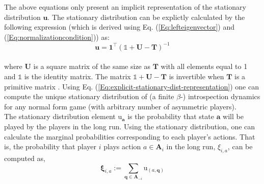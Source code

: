 \documentclass[11pt]{article}
\theoremstyle{plainCl1}
\theoremstyle{plainCl2}
\newcommand{\A}{\mathbf{A}}
\newcommand{\abf}{\mathbf{a}}
\newcommand{\qbf}{\mathbf{q}}
\newcommand{\T}{\mathbf{T}}
\newcommand{\ubf}{\mathbf{u}}
\begin{document}
\noindent The above equations only present an implicit representation of the stationary distribution $\ubf$. The stationary distribution can be explictly calculated by the following expression (which is derived using Eq. (\ref{Eq:lefteigenvector}) and (\ref{Eq:normalizationcondition})) as:
\begin{equation}
\ubf = \mathbf{1}^\intercal (\mathbb{1} + \mathbf{U} - \T)^{-1}
\label{Eq:explicit-stationary-dist-representation}
\end{equation} \\
where $\mathbf{U}$ is a square matrix of the same size as $\T$ with all elements equal to 1 and $\mathbb{1}$ is the identity matrix. The matrix $\mathbb{1} + \mathbf{U} - \T$ is invertible when $\T$ is a primitive matrix \cite{Couto:NJP:2022}. Using Eq. (\ref{Eq:explicit-stationary-dist-representation}) one can compute the unique stationary distribution of (a finite $\beta$-) introspection dynamics for any normal form game (with arbitrary number of asymmetric players).\\

\noindent The stationary distribution element $\mathrm{u}_\abf$ is the probability that state $\abf$ will be played by the players in the long run. Using the stationary distribution, one can calculate the marginal probabilities corresponding to each player's actions. That is, the probability that player $i$ plays action $a \in \A_i$ in the long run, $\xi_{i,a}$, can be computed as,
\begin{equation}
\mathbf{\xi}_{i,a} := \sum_{\qbf \in \A_{-i}} \mathrm{u}_{(a, \qbf)}
\label{Eq:marginal-definition}
\end{equation}
\end{document}
